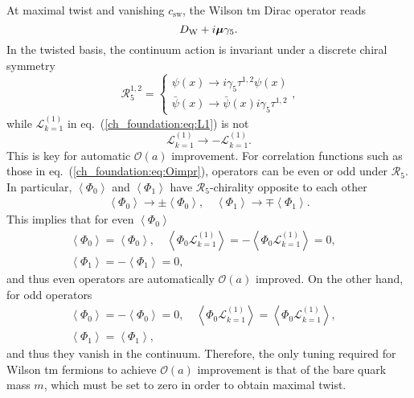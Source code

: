 At maximal twist and vanishing $c_{\textrm{sw}}$, the Wilson tm Dirac operator reads
\begin{equation}
D_{\textrm W}+i\boldsymbol{\mu}\gamma_5.
\end{equation}
In the twisted basis, the continuum action is invariant under a discrete chiral symmetry 
\begin{equation}
\mathcal{R}_5^{1,2}=\left\{\begin{matrix}
\psi(x)\rightarrow i\gamma_5\tau^{1,2}\psi(x) \\ 
\bar{\psi}(x)\rightarrow \bar{\psi}(x)i\gamma_5\tau^{1,2}
\end{matrix}\right.,
\end{equation}
while $\mathcal{L}_{k=1}^{(1)}$ in eq.~(\ref{ch_foundation:eq:L1}) is not 
\begin{equation}
\mathcal{L}_{k=1}^{(1)}\rightarrow-\mathcal{L}_{k=1}^{(1)}.
\end{equation}
This is key for automatic $\mathcal{O}(a)$ improvement. For correlation functions such as those in eq.~(\ref{ch_foundation:eq:Oimpr}), operators can be even or odd under $\mathcal{R}_5$. In particular, $\left<\Phi_0\right>$ and $\left<\Phi_1\right>$ have $\mathcal{R}_5$-chirality opposite to each other
\begin{gather}
\left<\Phi_0\right>\rightarrow\pm\left<\Phi_0\right>, \quad \left<\Phi_1\right>\rightarrow\mp\left<\Phi_1\right>.
\end{gather}
This implies that for even $\left<\Phi_0\right>$
\begin{gather}
\left<\Phi_0\right>=\left<\Phi_0\right>,
\quad \left<\Phi_0\mathcal{L}^{(1)}_{k=1}\right>=-\left<\Phi_0\mathcal{L}^{(1)}_{k=1}\right>=0, \quad \\ \left<\Phi_1\right>=-\left<\Phi_1\right>=0,
\end{gather}
and thus even operators are automatically $\mathcal{O}(a)$ improved. On the other hand, for odd operators 
\begin{gather}
\left<\Phi_0\right>=-\left<\Phi_0\right>=0, \quad
\left<\Phi_0\mathcal{L}^{(1)}_{k=1}\right>=\left<\Phi_0\mathcal{L}^{(1)}_{k=1}\right>, \quad \\ \left<\Phi_1\right>=\left<\Phi_1\right>,
\end{gather}
and thus they vanish in the continuum. Therefore, the only tuning required for Wilson tm fermions to achieve $\mathcal{O}(a)$ improvement is that of the bare quark mass $m$, which must be set to zero in order to obtain maximal twist.


